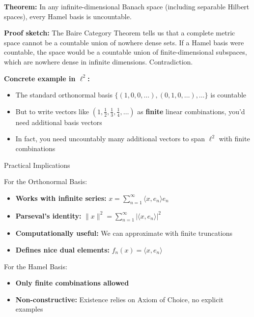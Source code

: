 \documentclass[aps,preprint]{revtex4}
\newenvironment{answer}
  {\begin{tcolorbox}[colback=green!5!white,colframe=green!75!black,title=Answer]}
  {\end{tcolorbox}}
\begin{document}
\begin{answer}
\textbf{Theorem:} In any infinite-dimensional Banach space (including
separable Hilbert spaces), every Hamel basis is uncountable.

\textbf{Proof sketch:} The Baire Category Theorem tells us that a complete
metric space cannot be a countable union of nowhere dense sets. If a Hamel
basis were countable, the space would be a countable union of
finite-dimensional subspaces, which are nowhere dense in infinite
dimensions. Contradiction.

\textbf{Concrete example in $\ell^2$:}

\begin{itemize}
\item The standard orthonormal basis $\{(1,0,0,\dots), (0,1,0,\dots),
\dots\} $ is countable

\item But to write vectors like $(1, \frac{1}{2}, \frac{1}{3}, \frac{1}{4},
\dots)$ as \textbf{finite} linear combinations, you'd need additional basis
vectors

\item In fact, you need uncountably many additional vectors to span $\ell^2$
with finite combinations
\end{itemize}

Practical Implications

For the Orthonormal Basis:

\begin{itemize}
\item \textbf{Works with infinite series:} $x = \sum_{n=1}^\infty \langle x,
e_n \rangle e_n$

\item \textbf{Parseval's identity:} $\|x\|^2 = \sum_{n=1}^\infty |\langle x,
e_n \rangle|^2$

\item \textbf{Computationally useful:} We can approximate with finite
truncations

\item \textbf{Defines nice dual elements:} $f_n(x) = \langle x, e_n \rangle$
\end{itemize}

For the Hamel Basis:

\begin{itemize}
\item \textbf{Only finite combinations allowed}

\item \textbf{Non-constructive:} Existence relies on Axiom of Choice, no
explicit examples


\end{itemize}
\end{answer}
\end{document}
